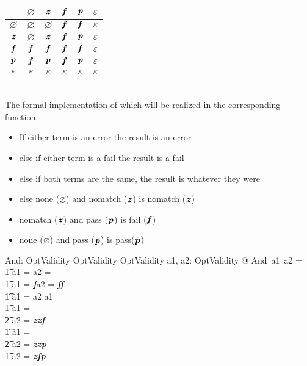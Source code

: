 \documentclass[fuzz]{llncs}
\def\pass{\textbf{\textit{p}}}
\def\fail{\textbf{\textit{f}}}
\def\none{\varnothing}
\def\error{\varepsilon}
\def\nomatch{\textbf{\textit{z}}}
\def\zcb{\textit{\textbf}}
\begin{document}
\begin{tabular}{c || c | c | c | c | c |}
   \hline 
   \zcb{And} & $\none$ & $\nomatch$ & $\fail$ & $\pass$ & $\error$ \\
   \hline \hline
   $\none$ & $\none$ & $\none$ & $\fail$ & $\fail$ & $\error$ \\ \hline
   $\nomatch$ & $\none$ & $\nomatch$ & $\fail$ & $\pass$ & $\error$ \\ \hline
   $\fail$ & $\fail$ & $\fail$ & $\fail$ & $\fail$ & $\error$ \\ \hline
   $\pass$ & $\fail$ & $\pass$ & $\fail$ & $\pass$ & $\error$ \\ \hline
   $\error$ & $\error$ & $\error$ & $\error$ & $\error$ & $\error$ \\ \hline 
\end{tabular} \\

The formal implementation of which will be realized in the corresponding function.
\begin{itemize}
\item If either term is an error the result is an error
\item else if either term is a fail the result is a fail
\item else if both terms are the same, the result is whatever they were
\item else none ($\none$) and nomatch ($\nomatch$) is nomatch ($\nomatch$)
\item nomatch ($\nomatch$) and pass ($\pass$) is fail ($\fail$)
\item none ($\none$) and pass ($\pass$) is pass($\pass$)
\end{itemize}
\begin{axdef}
   And: OptValidity \fun OptValidity \fun OptValidity
\where
   \forall a1, a2: OptValidity @ And~a1~a2 = \\
\t1 \IF a1 = \error \lor a2 = \error \THEN \error \\
\t1 \ELSE \IF a1 = \fail \lor a2 = \fail \THEN \fail \\
\t1 \ELSE \IF a1 = a2 \THEN a1 \\
\t1 \ELSE  \IF a1 = \none \THEN \\
\t2  \IF a2 = \nomatch  \THEN \nomatch \ELSE \fail \\
\t1 \ELSE \IF a1 = \none \THEN \\
\t2 \IF a2 = \nomatch \THEN \nomatch \ELSE \pass \\
\t1 \ELSE \IF a2 = \nomatch \THEN \fail \ELSE \pass
\end{axdef}
\end{document}
